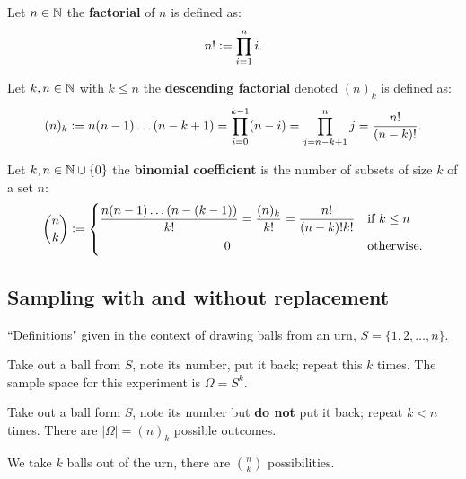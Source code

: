 \begingroup\belowdisplayskip=-0pt
    \begin{definition}[Factorial]
        Let $n\in\mathbb{N}$ the \textbf{factorial} of $n$ is defined as:
        \[
        n! := \prod_{i=1}^ni\textcolor{black}{.}
        \]
    \end{definition}
\endgroup

\begingroup\belowdisplayskip=-10pt
    \begin{definition}
        Let $k,n\in\mathbb{N}$ with $k\leq n$ the \textbf{descending factorial} denoted $(n)_k$ is defined as:
        \[
        (n)_k := n(n-1)\ldots(n-k+1) = \prod_{i=0}^{k-1}(n-i) = \prod_{j=n-k+1}^{n}j = \frac{n!}{(n-k)!}\textcolor{black}{.}
        \]
    \end{definition}
\endgroup

\begingroup\belowdisplayskip=-10pt
    \begin{definition}
        Let $k,n\in\mathbb{N}\cup \{0\}$ the \textbf{binomial coefficient} is the number of subsets of size $k$ of a set $n$:
        \[ 
            \binom{n}{k} := 
            \begin{dcases}
            \frac{n(n-1)\ldots(n-(k-1))}{k!} = \frac{(n)_k}{k!} = \frac{n!}{(n-k)!k!} & \textcolor{black}{\text{if }} k\leq n \\
            \omit\hfil0\hfil & \textcolor{black}{\text{otherwise.}}
            \end{dcases}
        \]
    \end{definition}
\endgroup

\subsection{Sampling with and without replacement}
``Definitions" given in the context of drawing balls from an urn, $S=\{1,2,\ldots,n\}$.
\begin{definition}
    Take out a ball from $S$, note its number, put it back; repeat this $k$ times. The sample space for this experiment is $\Omega = S^k$.
\end{definition}

\begin{definition}
    Take out a ball form $S$, note its number but \textbf{do not} put it back; repeat $k<n$ times. There are $|\Omega| = (n)_k$ possible outcomes.
\end{definition}

\begin{definition}
    We take $k$ balls out of the urn, there are $\binom{n}{k}$ possibilities.
\end{definition}

